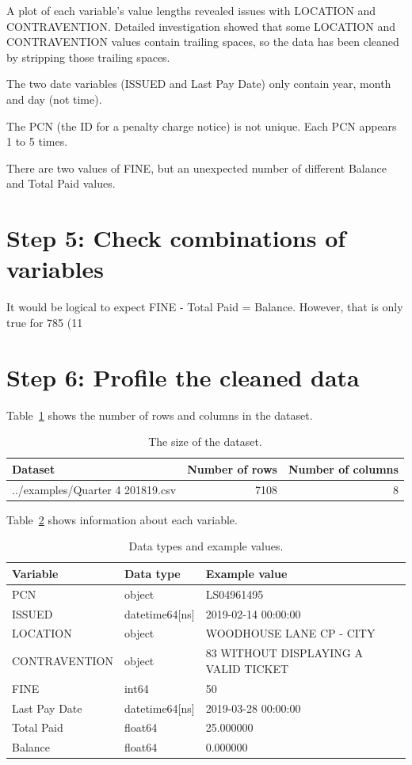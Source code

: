 \documentclass{article}
\begin{document}
A plot of each variable's value lengths revealed issues with LOCATION and CONTRAVENTION. Detailed investigation showed that some LOCATION and CONTRAVENTION values contain trailing spaces, so the data has been cleaned by stripping those trailing spaces.

The two date variables (ISSUED and Last Pay Date) only contain year, month and day (not time).

The PCN (the ID for a penalty charge notice) is not unique. Each PCN appears 1 to 5 times.

There are two values of FINE, but an unexpected number of different Balance and Total Paid values.

\section{Step 5: Check combinations of variables}

It would be logical to expect FINE - Total Paid = Balance. However, that is only true for 785 (11%

\section{Step 6: Profile the cleaned data}

Table~\ref{tab:1} shows the number of rows and columns in the dataset.

\begin{table}[h!]
\caption{The size of the dataset.}
\label{tab:1}
\begin{tabular}{lrr}
\toprule
Dataset & Number of rows & Number of columns \\
\midrule
../examples/Quarter 4 201819.csv & 7108 & 8 \\
\bottomrule
\end{tabular}
\end{table}

Table~\ref{tab:2} shows information about each variable.

\begin{table}[h!]
\caption{Data types and example values.}
\label{tab:2}
\begin{tabular}{lll}
\toprule
Variable & Data type & Example value \\
\midrule
PCN & object & LS04961495 \\
ISSUED & datetime64[ns] & 2019-02-14 00:00:00 \\
LOCATION & object & WOODHOUSE LANE  CP - CITY \\
CONTRAVENTION & object & 83 WITHOUT DISPLAYING A VALID TICKET \\
FINE & int64 & 50 \\
Last Pay Date & datetime64[ns] & 2019-03-28 00:00:00 \\
Total Paid & float64 & 25.000000 \\
Balance & float64 & 0.000000 \\
\bottomrule
\end{tabular}
\end{table}
\end{document}
